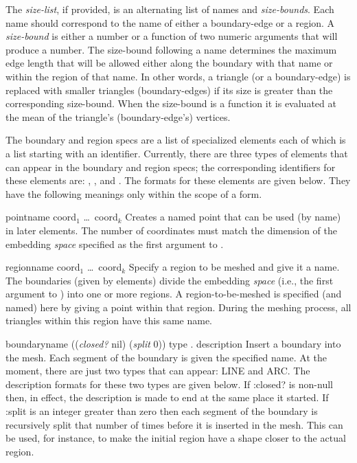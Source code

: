 The {\em size-list}, if provided, is an alternating list of names and
{\em size-bounds}.  Each name should correspond to the name of either a
boundary-edge or a region.  A {\em size-bound} is either a number or a
function of two numeric arguments that will produce a number.  The
size-bound following a name determines the maximum edge length that
will be allowed either along the boundary with that name or within the
region of that name.  In other words, a triangle (or a boundary-edge)
is replaced with smaller triangles (boundary-edges) if its size is
greater than the corresponding size-bound.  When the size-bound is a
function it is evaluated at the mean of the triangle's
(boundary-edge's) vertices.

The boundary and region specs are a list of specialized elements each
of which is a list starting with an identifier.  Currently, there are
three types of elements that can appear in the boundary and region
specs; the corresponding identifiers for these elements are: ,
, and .  The formats for these
elements are given below.  They have the following meanings only within
the scope of a  form.

\begin{specialdef}{point}{name coord$_1$ \ldots\ coord$_k$}
Creates a named point that can be used (by name) in later 
elements.  The number of coordinates must match the dimension of the
embedding {\em space} specified as the first argument to .
\end{specialdef}

\begin{specialdef}{region}{name coord$_1$ \ldots\ coord$_k$}
Specify a region to be meshed and give it a name.  The boundaries
(given by  elements) divide the embedding {\em
space} (i.e., the first argument to ) into one or
more regions.  A region-to-be-meshed is specified (and named) here by
giving a point within that region.  During the meshing process, all
triangles within this region have this same name.
\end{specialdef}

\begin{specialdef}{boundary}{name {
\rm (\key ({\em closed?} {\sf nil}) ({\em split} 0))} type . description}
Insert a boundary into the mesh.  Each segment of the boundary is
given the specified name.  At the moment, there are just two types
that can appear: {\sf LINE} and {\sf ARC}.  The description formats
for these two types are given below.  If {\sf :closed?} is non-null
then, in effect, the description is made to end at the same place it
started.  If {\sf :split} is an integer greater than zero then each
segment of the boundary is recursively split that number of times
before it is inserted in the mesh.  This can be used, for instance, to
make the initial region have a shape closer to the actual region.
\end{specialdef}

